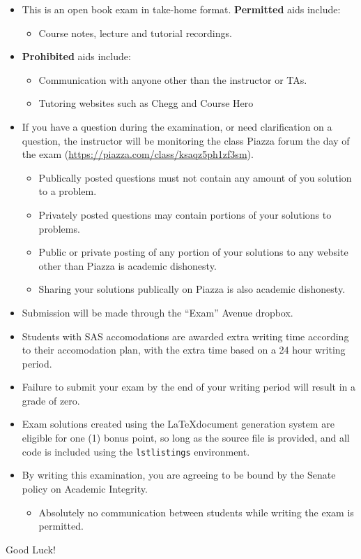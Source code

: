\documentclass{exam}
\begin{document}
\begin{itemize}
\item This is an open book exam in take-home format.  \textbf{Permitted} aids include:
\begin{itemize}
\item Course notes, lecture and tutorial recordings.
\end{itemize}
\item \textbf{Prohibited} aids include:
\begin{itemize}
\item Communication with anyone other than the instructor or TAs. 
\item Tutoring websites such as Chegg and Course Hero
\end{itemize}
\item If you have a question during the examination, or need clarification on a question, the instructor will be monitoring the class Piazza forum the day of the exam (\url{https://piazza.com/class/ksaqz5ph1zf3sm}).  
\begin{itemize}
\item Publically posted questions must not contain any amount of you solution to a problem.
\item Privately posted questions may contain portions of your solutions to problems.
\item Public or private posting of any portion of your solutions to any website other than Piazza is academic dishonesty.
\item Sharing your solutions publically on Piazza is also academic dishonesty.
\end{itemize}
\item Submission will be made through the ``Exam'' Avenue dropbox.
\item Students with SAS accomodations are awarded extra writing time according to their accomodation plan, with the extra time based on a 24 hour writing period.    
\item Failure to submit your exam by the end of your writing period will result in a grade of zero.  
\item Exam solutions created using the \LaTeX document generation system are eligible for one (1) bonus point, so long as the source file is provided, and all code is included using the \texttt{lstlistings} environment.  
\item By writing this examination, you are agreeing to be bound by the Senate policy on Academic Integrity.
\begin{itemize}
\item Absolutely no communication between students while writing the exam is permitted.  
\end{itemize}
\end{itemize}
\begin{center}
Good Luck! 
\end{center}
\end{document}
